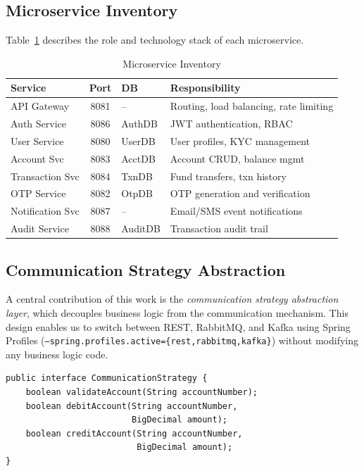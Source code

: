 \documentclass[journal]{IEEEtran}
\begin{document}
\subsection{Microservice Inventory}
\label{subsec:service_inventory}

Table~\ref{tab:services} describes the role and technology stack of each microservice.

\begin{table}[!t]
\caption{Microservice Inventory}
\label{tab:services}
\centering
\scriptsize
\begin{tabularx}{\columnwidth}{lclX}
\toprule
\textbf{Service} & \textbf{Port} & \textbf{DB} & \textbf{Responsibility} \\
\midrule
API Gateway & 8081 & -- & Routing, load balancing, rate limiting \\
Auth Service & 8086 & AuthDB & JWT authentication, RBAC \\
User Service & 8080 & UserDB & User profiles, KYC management \\
Account Svc & 8083 & AcctDB & Account CRUD, balance mgmt \\
Transaction Svc & 8084 & TxnDB & Fund transfers, txn history \\
OTP Service & 8082 & OtpDB & OTP generation and verification \\
Notification Svc & 8087 & -- & Email/SMS event notifications \\
Audit Service & 8088 & AuditDB & Transaction audit trail \\
\bottomrule
\end{tabularx}
\end{table}

\subsection{Communication Strategy Abstraction}
\label{subsec:comm_strategy}

A central contribution of this work is the \textit{communication strategy abstraction layer}, which decouples business logic from the communication mechanism. This design enables us to switch between REST, RabbitMQ, and Kafka using Spring Profiles (\texttt{--spring.profiles.active=\{rest,rabbitmq,kafka\}}) without modifying any business logic code.

\begin{lstlisting}[style=javastyle, caption={Communication strategy interface}, label={lst:strategy}]
public interface CommunicationStrategy {
    boolean validateAccount(String accountNumber);
    boolean debitAccount(String accountNumber, 
                         BigDecimal amount);
    boolean creditAccount(String accountNumber, 
                          BigDecimal amount);
}
\end{lstlisting}
\end{document}
